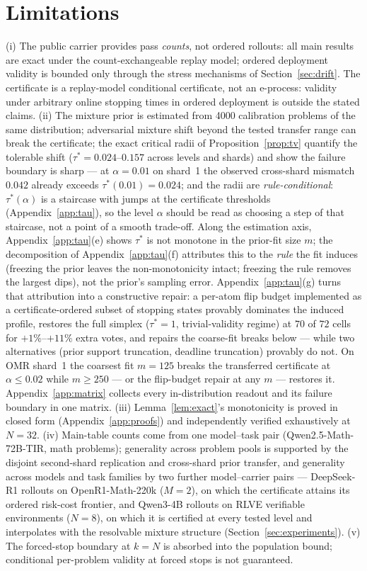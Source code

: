 \documentclass{article}
\theoremstyle{definition}
\theoremstyle{remark}
\begin{document}
\section{Limitations}
\label{sec:limits}
(i) The public carrier provides pass \emph{counts}, not ordered rollouts: all
main results are exact under the count-exchangeable replay model; ordered
deployment validity is bounded only through the stress mechanisms of
Section~\ref{sec:drift}. The certificate is a replay-model conditional
certificate, not an e-process: validity under arbitrary online stopping
times in ordered deployment is outside the stated claims. (ii) The mixture prior is estimated from 4000
calibration problems of the same distribution; adversarial mixture shift
beyond the tested transfer range can break the certificate; the exact
critical radii of Proposition~\ref{prop:tv} quantify the tolerable shift
($\tau^*=0.024$--$0.157$ across levels and shards) and show the failure
boundary is sharp --- at $\alpha=0.01$ on shard~1 the observed cross-shard
mismatch $0.042$ already exceeds $\tau^*(0.01)=0.024$; and the radii are
\emph{rule-conditional}: $\tau^*(\alpha)$ is a staircase with jumps at the
certificate thresholds (Appendix~\ref{app:tau}), so the level $\alpha$
should be read as choosing a step of that staircase, not a point of a
smooth trade-off. Along the estimation axis, Appendix~\ref{app:tau}(e)
shows $\tau^*$ is not monotone in the prior-fit size $m$; the
decomposition of Appendix~\ref{app:tau}(f) attributes this to the
\emph{rule} the fit induces (freezing the prior leaves the
non-monotonicity intact; freezing the rule removes the largest dips),
not the prior's sampling error. Appendix~\ref{app:tau}(g) turns that
attribution into a constructive repair: a per-atom flip budget
implemented as a certificate-ordered subset of stopping states provably
dominates the induced profile, restores the full simplex
($\tau^*=1$, trivial-validity regime) at $70$ of $72$ cells for
$+1\%$--$+11\%$ extra votes, and repairs the coarse-fit breaks below
--- while two alternatives (prior support truncation, deadline
truncation) provably do not. On OMR shard~1 the coarsest fit
$m{=}125$ breaks the
transferred certificate at $\alpha\le0.02$ while $m\ge250$ --- or the
flip-budget repair at any $m$ --- restores it.
Appendix~\ref{app:matrix} collects every in-distribution readout and its
failure boundary in one matrix.
(iii) Lemma~\ref{lem:exact}'s monotonicity is proved in closed form
(Appendix~\ref{app:proofs}) and independently verified exhaustively at
$N=32$.
(iv) Main-table counts come from one model--task pair
(Qwen2.5-Math-72B-TIR, math problems); generality across problem pools is
supported by the disjoint second-shard replication and cross-shard prior
transfer, and generality across models and task families by two further
model--carrier pairs --- DeepSeek-R1 rollouts on OpenR1-Math-220k ($M=2$),
on which the certificate attains its ordered risk-cost frontier, and
Qwen3-4B rollouts on RLVE verifiable environments ($N=8$), on which it is
certified at every tested level and interpolates with the resolvable mixture
structure (Section~\ref{sec:experiments}).
(v) The forced-stop boundary at $k=N$ is absorbed into the population
bound; conditional per-problem validity at forced stops is not guaranteed.
\end{document}
